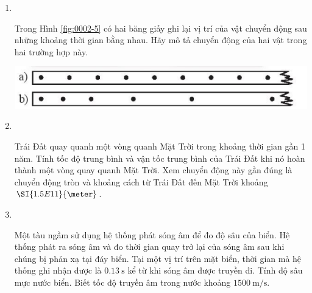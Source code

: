 \begin{enumerate}[label=\bfseries Bài \arabic*:]
\item {}\\
{Trong Hình \ref{fig:0002-5} có hai băng giấy ghi lại vị trí của vật chuyển động sau những khoảng thời gian bằng nhau. Hãy mô tả chuyển động của hai vật trong hai trường hợp này.
	\begin{center}
		\includegraphics[width=0.4\linewidth]{../figs/VN10-2023-PH-TP0002-5}
		\label{fig:0002-5}
	\end{center}

}

\item {}\\
{Trái Đất quay quanh một vòng quanh Mặt Trời trong khoảng thời gian gần 1 năm. Tính tốc độ trung bình và vận tốc trung bình của Trái Đất khi nó hoàn thành một vòng quay quanh Mặt Trời. Xem chuyển động này gần đúng là chuyển động tròn và khoảng cách từ Trái Đất đến Mặt Trời khoảng $\SI{1.5E11}{\meter}$.

}

\item {}\\
{Một tàu ngầm sử dụng hệ thống phát sóng âm để đo độ sâu của biển. Hệ thống phát ra sóng âm và đo thời gian quay trở lại của sóng âm sau khi chúng bị phản xạ tại đáy biển. Tại một vị trí trên mặt biển, thời gian mà hệ thống ghi nhận được là $\SI{0.13}{\second}$ kể từ khi sóng âm được truyền đi. Tính độ sâu mực nước biển. Biết tốc độ truyền âm trong nước khoảng $\SI{1500}{\meter/\second}$.

}


\end{enumerate}

